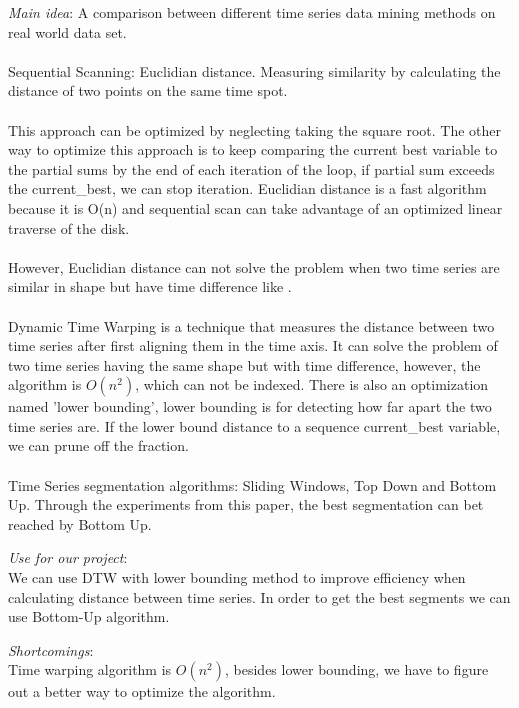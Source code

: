 \begin{itemize*}
\item {\em Main idea}: A comparison between different time series data mining methods on real world data set. \\\\
Sequential Scanning: Euclidian distance. Measuring similarity by calculating the distance of two points on the same time spot. \\\\
This approach can be optimized by neglecting taking the square root. The other way to optimize this approach is to keep comparing the current best variable to the partial sums by the end of each iteration of the loop, if partial sum exceeds the current\_best, we can stop iteration. Euclidian distance is a fast algorithm because it is O(n) and sequential scan can take advantage of an optimized linear traverse of the disk.\\\\
However, Euclidian distance can not solve the problem when two time series are similar in shape but have time difference like .\\\\
Dynamic Time Warping is a technique that measures the distance between two time series after first aligning them in the time axis. It can solve the problem of two time series having the same shape but with time difference, however, the algorithm is  $O(n^2)$, which can not be indexed. There is also an optimization named 'lower bounding', lower bounding is for detecting how far apart the two time series are. If the lower bound distance to a sequence \geslant current\_best variable, we can prune off the fraction. \\\\
Time Series segmentation algorithms: Sliding Windows, Top Down and Bottom Up. Through the experiments from this paper, the best segmentation can bet reached by Bottom Up.\\
\item {\em Use for our project}:\\
      We can use DTW with lower bounding method to improve efficiency when calculating distance between time series. In order to get the best segments we can use Bottom-Up algorithm. 
\item {\em Shortcomings}:\\
      Time warping algorithm is $O(n^2)$, besides lower bounding, we have to figure out a better way to optimize the algorithm. 
\end{itemize*}


